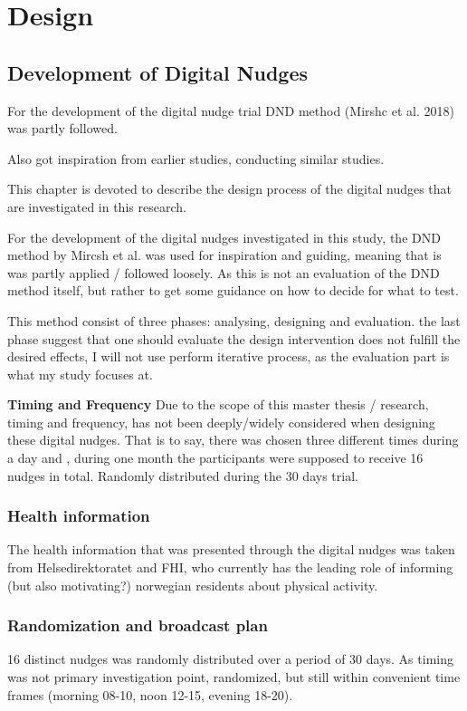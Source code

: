 \chapter{Design}

\section{Development of Digital Nudges} 
For the development of the digital nudge trial DND method (Mirshc et al. 2018) was partly followed. 

Also got inspiration from earlier studies, conducting similar studies. 

This chapter is devoted to describe the design process of the digital nudges that are investigated in this research. 

For the development of the digital nudges investigated in this study, the DND method by Mircsh et al. was used for inspiration and guiding, meaning that is was partly applied / followed loosely. As this is not an evaluation of the DND method itself, but rather to get some guidance on how to decide for what to test. 

This method consist of three phases: analysing, designing and evaluation. the last phase suggest that one should evaluate the design intervention does not fulfill the desired effects, I will not use perform iterative process, as the evaluation part is what my study focuses at. 

\textbf{Timing and Frequency }
Due to the scope of this master thesis / research, timing and frequency, has not been deeply/widely considered when designing these digital nudges.  That is to say, there was chosen three different times during a day and , during one month the participants were supposed to receive 16 nudges in total. Randomly distributed during the 30 days trial.  

\subsection{Health information}
The health information that was presented through the digital nudges was taken from Helsedirektoratet and FHI, who currently has the leading role of informing (but also motivating?) norwegian residents about physical activity.

\subsection{Randomization and broadcast plan}
16 distinct nudges was randomly distributed over a period of 30 days. As timing was not primary investigation point, randomized, but still within convenient time frames (morning 08-10, noon 12-15, evening 18-20). 

